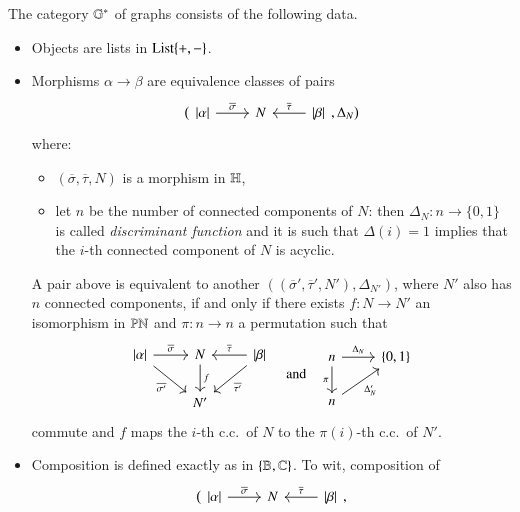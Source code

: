 \begin{definition}\label{definition:graph category definitive}
    The category ${\mathbb G}^*$ of graphs consists of the following data.
    \begin{itemize}[leftmargin=*]
        \item Objects are lists in $\mathrm{List}\{+,-\}$.
        \item Morphisms $\alpha \to \beta$ are equivalence classes of pairs
        \[
        \bigl(
        \begin{tikzcd}
        \length\alpha \ar[r,"\overline\sigma"] & N & \ar[l,"\overline\tau"'] \length\beta
        \end{tikzcd},
        \Delta_N  \bigr)
        \]
        where:
        \begin{itemize}
            \item $(\overline\sigma,\overline\tau,N)$ is a morphism in $\mathbb H$,
            \item let $n$ be the number of connected components of $N$: then $\Delta_N \colon n \to \{0,1\}$ is called \emph{discriminant function} and it is such that  $\Delta(i)=1$ implies that the $i$-th connected component of $N$ is acyclic.		
        \end{itemize}
        A pair above is equivalent to another $((\overline\sigma',\overline\tau',N'),\Delta_{N'})$, where $N'$ also has $n$ connected components, if and only if there exists $f \colon N \to N'$ an isomorphism in $\mathbb{PN}$ and $\pi \colon n \to n$ a permutation such that
        \[
        \begin{tikzcd}
        \length\alpha \ar[r,"\overline\sigma"] \ar[dr,"\overline{\sigma'}"'] & N \ar[d,"f"] & \length\beta \ar[l,"\overline\tau"'] \ar[dl,"\overline{\tau'}"] \\
        & N' 
        \end{tikzcd}
        \quad \text{and} \quad
        \begin{tikzcd}
        n \ar[r,"\Delta_N"] \ar[d,"\pi"'] & \{0,1\} \\
        n \ar[ur,"\Delta_N'"'] 
        \end{tikzcd}
        \]
        commute and $f$ maps the $i$-th c.c.\ of $N$ to the $\pi(i)$-th c.c.\ of $N'$.
        \item
        Composition is defined exactly as in $\{ \mathbb B,\mathbb C\}$. To wit, composition of
        \[
        \bigl(
        \begin{tikzcd}
        \length\alpha \ar[r,"\overline\sigma"] & N & \ar[l,"\overline\tau"'] \length\beta
        \end{tikzcd},
\]
\end{itemize}
\end{definition}
